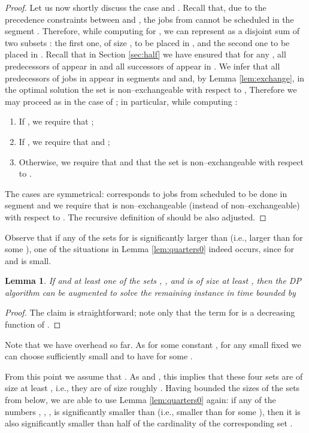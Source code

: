 \documentclass{article}
\newtheorem{lemma}[theorem]{Lemma}
\theoremstyle{definition}
\begin{document}
\begin{proof}
Let us now shortly discuss the case  and .
Recall that, due to the precedence constraints between  and ,
the jobs from  cannot be scheduled in the segment . Therefore, while computing  for ,
we can represent  as a disjoint sum of two subsets :
the first one, of size , to be placed in , and the second one to be placed in .
Recall that in Section \ref{sec:half} we have ensured that for any , all predecessors of  appear
in  and all successors of  appear in .
We infer that all predecessors of jobs in  appear in segments  and 
and, by Lemma \ref{lem:exchange}, in the optimal solution the set  is non--exchangeable with respect to ,
Therefore we may proceed as in the case of ; in particular, while computing :
\begin{enumerate}
\item If , we require that ;
\item If , we require that  and ;
\item Otherwise, we require that  and that the set  is non--exchangeable with respect to .
\end{enumerate}

The cases  are symmetrical:
 corresponds to jobs from  scheduled to be done in segment  and
we require that  is non--exchangeable (instead of non--exchangeable) with respect to .
The recursive definition of  should be also adjusted.
\end{proof}

Observe that if any of the sets  for 
is significantly larger than  (i.e., larger than  for some ),
one of the situations in Lemma \ref{lem:quarters0} indeed occurs, since  for  and  is small.

\begin{lemma}\label{lem:quarters1}
If  and at least one of the sets , ,  and  is of size at least , then
the DP algorithm can be augmented to solve the remaining instance in time bounded by

\end{lemma}
\begin{proof}
The claim is straightforward; note only that the term  for  is a decreasing function
of . 
\end{proof}

Note that we have  overhead so far. As  
for some constant , for any small fixed  we can choose sufficiently small  and 
to have  for some .

From this point we assume that . As  and , this implies
that these four sets are of size at least , i.e., they are of size roughly .
Having bounded the sizes of the sets  from below, we are able to use Lemma \ref{lem:quarters0} again:
if any of the numbers , , ,  is significantly smaller than  (i.e., smaller than  for some ),
then it is also significantly smaller than half of the cardinality of the corresponding set .
\end{document}
